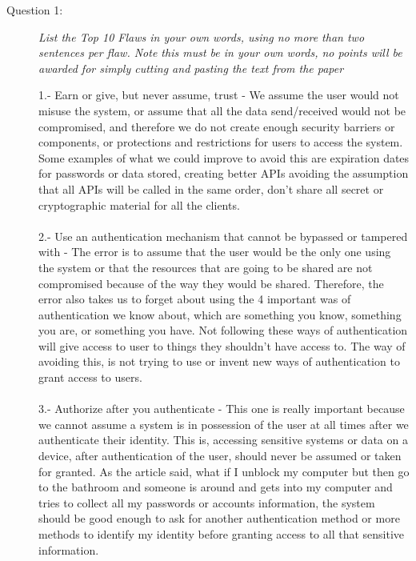 \documentclass[12pt]{article}
\begin{document}
\begin{description}
\item[Question 1:] {\color{grey}\textit{List the Top 10 Flaws in your own words, using no more than two sentences per flaw. Note this must be in your own words, no points will be awarded for simply cutting and pasting the text from the paper}} \par
1.- Earn or give, but never assume, trust - We assume the user would not misuse the system, or assume that all the data send/received would not be compromised, and therefore we do not create enough security barriers or components, or protections and restrictions for users to access the system. Some examples of what we could improve to avoid this are expiration dates for passwords or data stored, creating better APIs avoiding the assumption that all APIs will be called in the same order, don't share all secret or cryptographic material for all the clients. \\\\

2.- Use an authentication mechanism that cannot be bypassed or tampered with - The error is to assume that the user would be the only one using the system or that the resources that are going to be shared are not compromised because of the way they would be shared. Therefore, the error also takes us to forget about using the 4 important was of authentication we know about, which are something you know, something you are, or something you have. Not following these ways of authentication will give access to user to things they shouldn't have access to. The way of avoiding this, is not trying to use or invent new ways of authentication to grant access to users.\\ \\

3.- Authorize after you authenticate - This one is really important because we cannot assume a system is in possession of the user at all times after we authenticate their identity. This is, accessing sensitive systems or data on a device, after authentication of the user, should never be assumed or taken for granted. As the article said, what if I unblock my computer but then go to the bathroom and someone is around and gets into my computer and tries to collect all my passwords or accounts information, the system should be good enough to ask for another authentication method or more methods to identify my identity before granting access to all that sensitive information.  \\\\


\end{description}
\end{document}
